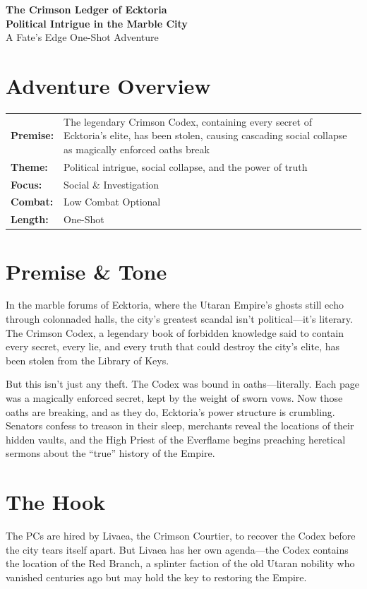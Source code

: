 \documentclass[11pt]{article}
\begin{document}


\begin{center}
    \textbf{\LARGE The Crimson Ledger of Ecktoria} \\
    \vspace{0.2cm}
    \textbf{Political Intrigue in the Marble City} \\
    \vspace{0.1cm}
    \small A Fate's Edge One-Shot Adventure
\end{center}

\section*{Adventure Overview}
\begin{longtable}{@{}ll}
    \textbf{Premise:} & The legendary Crimson Codex, containing every secret of Ecktoria's elite, has been stolen, causing cascading social collapse as magically enforced oaths break \\
    \textbf{Theme:} & Political intrigue, social collapse, and the power of truth \\
    \textbf{Focus:} & Social \& Investigation \\
    \textbf{Combat:} & Low Combat Optional \\
    \textbf{Length:} & One-Shot \\
\end{longtable}

\section*{Premise \& Tone}
In the marble forums of Ecktoria, where the Utaran Empire's ghosts still echo through colonnaded halls, the city's greatest scandal isn't political---it's literary. The Crimson Codex, a legendary book of forbidden knowledge said to contain every secret, every lie, and every truth that could destroy the city's elite, has been stolen from the Library of Keys.

But this isn't just any theft. The Codex was bound in oaths---literally. Each page was a magically enforced secret, kept by the weight of sworn vows. Now those oaths are breaking, and as they do, Ecktoria's power structure is crumbling. Senators confess to treason in their sleep, merchants reveal the locations of their hidden vaults, and the High Priest of the Everflame begins preaching heretical sermons about the ``true'' history of the Empire.

\section*{The Hook}
The PCs are hired by Livaea, the Crimson Courtier, to recover the Codex before the city tears itself apart. But Livaea has her own agenda---the Codex contains the location of the Red Branch, a splinter faction of the old Utaran nobility who vanished centuries ago but may hold the key to restoring the Empire.
\end{document}

